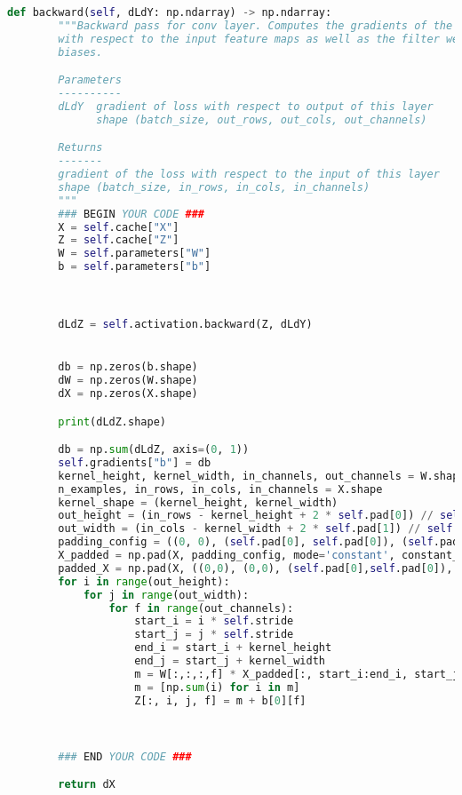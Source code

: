 \begin{lstlisting}[language=Python]
    def backward(self, dLdY: np.ndarray) -> np.ndarray:
        """Backward pass for conv layer. Computes the gradients of the output
        with respect to the input feature maps as well as the filter weights and
        biases.

        Parameters
        ----------
        dLdY  gradient of loss with respect to output of this layer
              shape (batch_size, out_rows, out_cols, out_channels)

        Returns
        -------
        gradient of the loss with respect to the input of this layer
        shape (batch_size, in_rows, in_cols, in_channels)
        """
        ### BEGIN YOUR CODE ###
        X = self.cache["X"]
        Z = self.cache["Z"]
        W = self.parameters["W"]
        b = self.parameters["b"]



        dLdZ = self.activation.backward(Z, dLdY)


        db = np.zeros(b.shape)
        dW = np.zeros(W.shape)
        dX = np.zeros(X.shape)

        print(dLdZ.shape)

        db = np.sum(dLdZ, axis=(0, 1))
        self.gradients["b"] = db
        kernel_height, kernel_width, in_channels, out_channels = W.shape
        n_examples, in_rows, in_cols, in_channels = X.shape
        kernel_shape = (kernel_height, kernel_width)
        out_height = (in_rows - kernel_height + 2 * self.pad[0]) // self.stride + 1
        out_width = (in_cols - kernel_width + 2 * self.pad[1]) // self.stride + 1
        padding_config = ((0, 0), (self.pad[0], self.pad[0]), (self.pad[1], self.pad[1]), (0, 0))
        X_padded = np.pad(X, padding_config, mode='constant', constant_values=0)
        padded_X = np.pad(X, ((0,0), (0,0), (self.pad[0],self.pad[0]), (self.pad[1],self.pad[1])), 'constant')
        for i in range(out_height):
            for j in range(out_width):
                for f in range(out_channels):
                    start_i = i * self.stride
                    start_j = j * self.stride
                    end_i = start_i + kernel_height
                    end_j = start_j + kernel_width                    
                    m = W[:,:,:,f] * X_padded[:, start_i:end_i, start_j:end_j, :]
                    m = [np.sum(i) for i in m]
                    Z[:, i, j, f] = m + b[0][f]
        


        ### END YOUR CODE ###

        return dX

\end{lstlisting}


